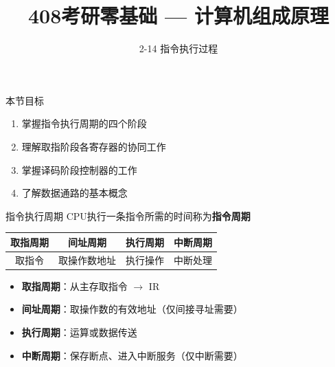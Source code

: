 \documentclass[10pt, aspectratio=169]{beamer}
\title{408考研零基础 --- 计算机组成原理}
\subtitle{2-14 指令执行过程}
\author{}
\date{}
\begin{document}
\begin{frame}{本节目标}
    \begin{enumerate}
        \item 掌握指令执行周期的四个阶段
        \item 理解取指阶段各寄存器的协同工作
        \item 掌握译码阶段控制器的工作
        \item 了解数据通路的基本概念
    \end{enumerate}
\end{frame}

\begin{frame}{指令执行周期}
    CPU执行一条指令所需的时间称为\textbf{指令周期}
    \vspace{0.5em}
    \begin{center}
        \begin{tabular}{|c|c|c|c|}
            \hline
            \textbf{取指周期} & \textbf{间址周期} & \textbf{执行周期} & \textbf{中断周期} \\
            \hline
            取指令 & 取操作数地址 & 执行操作 & 中断处理 \\
            \hline
        \end{tabular}
    \end{center}
    \vspace{0.5em}
    \begin{itemize}
        \item \textbf{取指周期}：从主存取指令 $\rightarrow$ IR
        \item \textbf{间址周期}：取操作数的有效地址（仅间接寻址需要）
        \item \textbf{执行周期}：运算或数据传送
        \item \textbf{中断周期}：保存断点、进入中断服务（仅中断需要）
    \end{itemize}
\end{frame}
\end{document}
